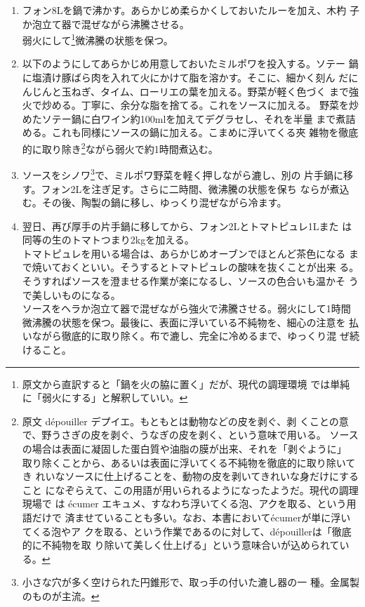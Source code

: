 \begin{recette}
\begin{enumerate}
\def\labelenumi{\arabic{enumi}.}
\item
  フォン8Lを鍋で沸かす。あらかじめ柔らかくしておいたルーを加え、木杓
  子か泡立て器で混ぜながら沸騰させる。\\
  弱火にして\footnote{原文から直訳すると「鍋を火の脇に置く」だが、現代の調理環境
    では単純に「弱火にする」と解釈していい。}微沸騰の状態を保つ。
\item
  以下のようにしてあらかじめ用意しておいたミルポワを投入する。ソテー
  鍋に塩漬け豚ばら肉を入れて火にかけて脂を溶かす。そこに、細かく刻ん
  だにんじんと玉ねぎ、タイム、ローリエの葉を加える。野菜が軽く色づく
  まで強火で炒める。丁寧に、余分な脂を捨てる。これをソースに加える。
  野菜を炒めたソテー鍋に白ワイン約100mlを加えてデグラセし、それを半量
  まで煮詰める。これも同様にソースの鍋に加える。こまめに浮いてくる夾
  雑物を徹底的に取り除き\footnote{原文 dépouiller
    デプイエ。もともとは動物などの皮を剥ぐ、剥
    くことの意で、野うさぎの皮を剥ぐ、うなぎの皮を剥く、という意味で用いる。
    ソースの場合は表面に凝固した蛋白質や油脂の膜が出来、それを「剥ぐように」
    取り除くことから、あるいは表面に浮いてくる不純物を徹底的に取り除いてき
    れいなソースに仕上げることを、動物の皮を剥いてきれいな身だけにすること
    になぞらえて、この用語が用いられるようになったようだ。現代の調理現場で
    は écumer
    エキュメ、すなわち浮いてくる泡、アクを取る、という用語だけで
    済ませていることも多い。なお、本書においてécumerが単に浮いてくる泡やア
    クを取る、という作業であるのに対して、dépouillerは「徹底的に不純物を取
    り除いて美しく仕上げる」という意味合いが込められている。}ながら弱火で約1時間煮込む。
\item
  ソースをシノワ\footnote{小さな穴が多く空けられた円錐形で、取っ手の付いた漉し器の一
    種。金属製のものが主流。}で、ミルポワ野菜を軽く押しながら漉し、別の
  片手鍋に移す。フォン2Lを注ぎ足す。さらに二時間、微沸騰の状態を保ち
  ならが煮込む。その後、陶製の鍋に移し、ゆっくり混ぜながら冷ます。
\item
  翌日、再び厚手の片手鍋に移してから、フォン2Lとトマトピュレ1Lまた
  は同等の生のトマトつまり2kgを加える。\\
  トマトピュレを用いる場合は、あらかじめオーブンでほとんど茶色になる
  まで焼いておくといい。そうするとトマトピュレの酸味を抜くことが出来
  る。\\
  そうすればソースを澄ませる作業が楽になるし、ソースの色合いも温かそ
  うで美しいものになる。\\
  ソースをヘラか泡立て器で混ぜながら強火で沸騰させる。弱火にして1時間
  微沸騰の状態を保つ。最後に、表面に浮いている不純物を、細心の注意を
  払いながら徹底的に取り除く。布で漉し、完全に冷めるまで、ゆっくり混
  ぜ続けること。
\end{enumerate}


\end{recette}
